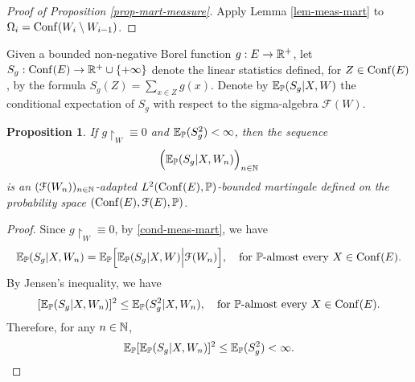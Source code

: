 \documentclass[12pt]{paper}
\newtheorem{proposition}[theorem]{Proposition}
\numberwithin{theorem}{section}
\numberwithin{figure}{section}
\numberwithin{equation}{section}
\begin{document}
\begin{proof}[Proof of Proposition \ref{prop-mart-measure}]
Apply   Lemma \ref{lem-meas-mart} to $\Omega_i=  \mathrm{Conf}(W_i \setminus W_{i-1})$.
\end{proof}







Given  a bounded non-negative Borel function $g: E\rightarrow \mathbb{R}^{+}$,  let $S_g: \mathrm{Conf}(E)\rightarrow \mathbb{R}^{+} \cup\{+\infty\}$ denote the linear statistics defined, for $Z\in \mathrm{Conf}(E)$, by the formula $S_g(Z)=\sum_{x\in Z} g(x)$.
Denote by  $\mathbb{E}_{\mathbb{P}}(S_g |X,  W)$  the conditional expectation of $S_g$ with respect to the sigma-algebra $\mathcal{F}(W)$.
\begin{proposition}\label{prop-L2}
If $g\restriction_W \equiv 0$ and $\mathbb{E}_{\mathbb{P}}(S_g^2) <\infty$, then the sequence
\begin{align}\label{mart-nb}
\Big(\mathbb{E}_{\mathbb{P}}(S_g |X,  W_n)\Big)_{n\in\mathbb{N}}
\end{align}
is an $(\mathcal{F}(W_n))_{n\in\mathbb{N}}$-adapted  $L^2(\mathrm{Conf}(E), \mathbb{P})$-bounded martingale defined on the probability space $(\mathrm{Conf}(E), \mathcal{F}(E), \mathbb{P})$.
\end{proposition}

\begin{proof}
Since $g\restriction_W \equiv 0$, by \eqref{cond-meas-mart}, we have
\[
\mathbb{E}_{\mathbb{P}}(S_g |X,  W_n)   =  \mathbb{E}_{\mathbb{P}}\Big[  \mathbb{E}_{\mathbb{P}}(S_g | X, W)\Big| \mathcal{F}(W_n) \Big], \quad \text{for $\mathbb{P}$-almost every $X\in \mathrm{Conf}(E)$.}
\]
By Jensen's inequality, we have
\[
[\mathbb{E}_{\mathbb{P}}(S_g |X,  W_n) ]^2   \le \mathbb{E}_{\mathbb{P}}(S_g^2  |X,  W_n), \quad \text{for $\mathbb{P}$-almost every $X\in \mathrm{Conf}(E)$.}
\]
Therefore, for any $n\in\mathbb{N}$,
\[
\mathbb{E}_{\mathbb{P}} [\mathbb{E}_{\mathbb{P}}(S_g |X,  W_n) ]^2   \le \mathbb{E}_{\mathbb{P}}(S_g^2 )< \infty.
\]
\end{proof}
\end{document}
